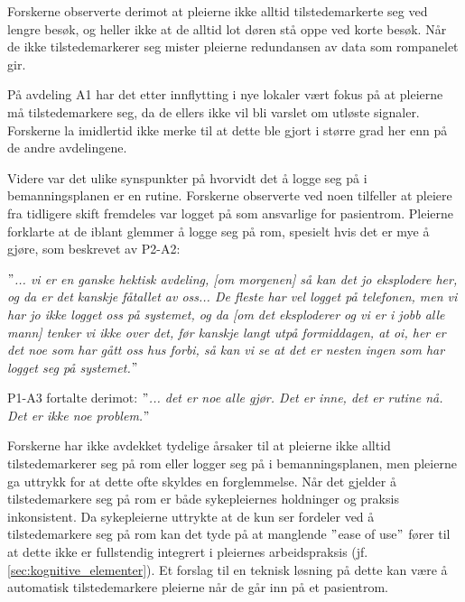 \noindent
Forskerne observerte derimot at pleierne ikke alltid tilstedemarkerte seg ved lengre besøk, og heller ikke at de alltid lot døren stå oppe ved korte besøk. Når de ikke tilstedemarkerer seg mister pleierne redundansen av data som rompanelet gir. 

\noindent
På avdeling A1 har det etter innflytting i nye lokaler vært fokus på at pleierne må tilstedemarkere seg, da de ellers ikke vil bli varslet om utløste signaler. Forskerne la imidlertid ikke merke til at dette ble gjort i større grad her enn på de andre avdelingene. 

\noindent
Videre var det ulike synspunkter på hvorvidt det å logge seg på i bemanningsplanen er en rutine. Forskerne observerte ved noen tilfeller at pleiere fra tidligere skift fremdeles var logget på som ansvarlige for pasientrom. Pleierne forklarte at de iblant glemmer å logge seg på rom, spesielt hvis det er mye å gjøre, som beskrevet av P2-A2:

\noindent
\textit{$"$... vi er en ganske hektisk avdeling, [om morgenen] så kan det jo eksplodere her, og da er det kanskje fåtallet av oss... De fleste har vel logget på telefonen, men vi har jo ikke logget oss på systemet, og da [om det eksploderer og vi er i jobb alle mann] tenker vi ikke over det, før kanskje langt utpå formiddagen, at oi, her er det noe som har gått oss hus forbi, så kan vi se at det er nesten ingen som har logget seg på systemet.$"$}

\noindent
P1-A3 fortalte derimot: \textit{$"$... det er noe alle gjør. Det er inne, det er rutine nå. Det er ikke noe problem.$"$} 

\noindent
Forskerne har ikke avdekket tydelige årsaker til at pleierne ikke alltid tilstedemarkerer seg på rom eller logger seg på i bemanningsplanen, men pleierne ga uttrykk for at dette ofte skyldes en forglemmelse. Når det gjelder å tilstedemarkere seg på rom er både sykepleiernes holdninger og praksis inkonsistent. Da sykepleierne uttrykte at de kun ser fordeler ved å tilstedemarkere seg på rom kan det tyde på at manglende $"$ease of use$"$ fører til at dette ikke er fullstendig integrert i pleiernes arbeidspraksis (jf. \ref{sec:kognitive_elementer}). Et forslag til en teknisk løsning på dette kan være å automatisk tilstedemarkere pleierne når de går inn på et pasientrom. 

